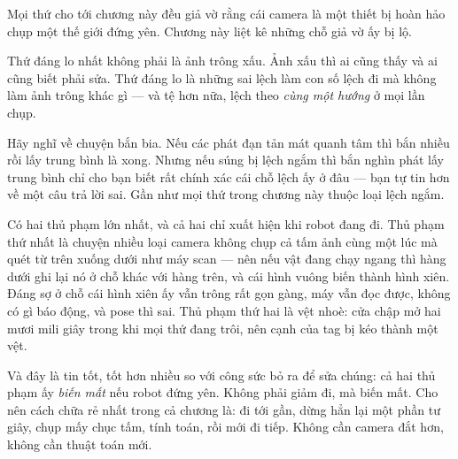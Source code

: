 \documentclass[../../marker.tex]{subfiles}
\begin{document}
\begin{traloi}
\end{traloi}

\begin{dongian}
Mọi thứ cho tới chương này đều giả vờ rằng cái camera là một thiết bị hoàn hảo chụp một thế giới đứng yên. Chương này liệt kê những chỗ giả vờ ấy bị lộ.

Thứ đáng lo nhất không phải là ảnh trông xấu. Ảnh xấu thì ai cũng thấy và ai cũng biết phải sửa. Thứ đáng lo là những sai lệch làm con số lệch đi mà không làm ảnh trông khác gì --- và tệ hơn nữa, lệch theo \emph{cùng một hướng} ở mọi lần chụp.

Hãy nghĩ về chuyện bắn bia. Nếu các phát đạn tản mát quanh tâm thì bắn nhiều rồi lấy trung bình là xong. Nhưng nếu súng bị lệch ngắm thì bắn nghìn phát lấy trung bình chỉ cho bạn biết rất chính xác cái chỗ lệch ấy ở đâu --- bạn tự tin hơn về một câu trả lời sai. Gần như mọi thứ trong chương này thuộc loại lệch ngắm.

Có hai thủ phạm lớn nhất, và cả hai chỉ xuất hiện khi robot đang đi. Thủ phạm thứ nhất là chuyện nhiều loại camera không chụp cả tấm ảnh cùng một lúc mà quét từ trên xuống dưới như máy scan --- nên nếu vật đang chạy ngang thì hàng dưới ghi lại nó ở chỗ khác với hàng trên, và cái hình vuông biến thành hình xiên. Đáng sợ ở chỗ cái hình xiên ấy vẫn trông rất gọn gàng, máy vẫn đọc được, không có gì báo động, và pose thì sai. Thủ phạm thứ hai là vệt nhoè: cửa chập mở hai mươi mili giây trong khi mọi thứ đang trôi, nên cạnh của tag bị kéo thành một vệt.

Và đây là tin tốt, tốt hơn nhiều so với công sức bỏ ra để sửa chúng: cả hai thủ phạm ấy \emph{biến mất} nếu robot đứng yên. Không phải giảm đi, mà biến mất. Cho nên cách chữa rẻ nhất trong cả chương là: đi tới gần, dừng hẳn lại một phần tư giây, chụp mấy chục tấm, tính toán, rồi mới đi tiếp. Không cần camera đắt hơn, không cần thuật toán mới.


\end{dongian}
\end{document}
